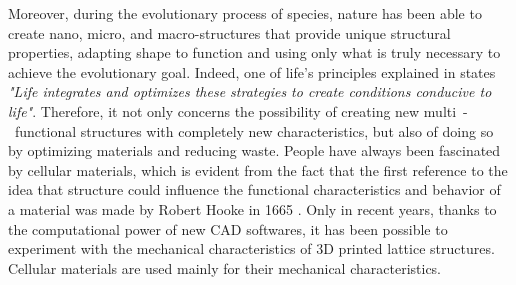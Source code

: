 Moreover, during the evolutionary process of species, nature has been able to create nano, micro, and macro-structures that provide unique structural properties, adapting shape to function and using only what is truly necessary to achieve the evolutionary goal. Indeed, one of life's principles explained in \citeauthor{baumeister_biomimicry_2011} states \textit{"Life integrates and optimizes these strategies to create conditions conducive to life"}. Therefore, it not only concerns the possibility of creating new multi~-~functional structures with completely new characteristics, but also of doing so by optimizing materials and reducing waste. People have always been fascinated by cellular materials, which is evident from the fact that the first reference to the idea that structure could influence the functional characteristics and behavior of a material was made by Robert Hooke in 1665 \cite{l_gibson_cellular_2010}. Only in recent years, thanks to the computational power of new CAD softwares, it has been possible to experiment with the mechanical characteristics of 3D printed lattice structures. Cellular materials are used mainly for their mechanical characteristics.

